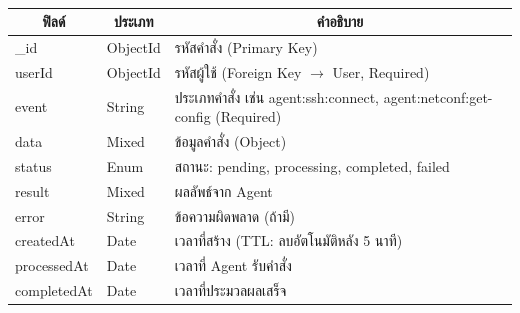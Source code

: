 
\begin{table}[H]
    \caption{}
    \label{tab:agent-command-structure}
    \fontSixTeen 
    \begin{tabularx}{\textwidth}{|l|l|X|} 
        \hline
        \multicolumn{1}{|c|}{\textbf{ฟิลด์}} & \multicolumn{1}{c|}{\textbf{ประเภท}} & \multicolumn{1}{c|}{\textbf{คำอธิบาย}} \\
        \hline
        \_id & ObjectId & รหัสคำสั่ง (Primary Key) \\
        \hline
        userId & ObjectId & รหัสผู้ใช้ (Foreign Key $\rightarrow$ User, Required) \\
        \hline
        event & String & ประเภทคำสั่ง เช่น agent:ssh:connect, agent:netconf:get-config (Required) \\
        \hline
        data & Mixed & ข้อมูลคำสั่ง (Object) \\
        \hline
        status & Enum & สถานะ: pending, processing, completed, failed \\
        \hline
        result & Mixed & ผลลัพธ์จาก Agent \\
        \hline
        error & String & ข้อความผิดพลาด (ถ้ามี) \\
        \hline
        createdAt & Date & เวลาที่สร้าง (TTL: ลบอัตโนมัติหลัง 5 นาที) \\
        \hline
        processedAt & Date & เวลาที่ Agent รับคำสั่ง \\
        \hline
        completedAt & Date & เวลาที่ประมวลผลเสร็จ \\
        \hline
    \end{tabularx}
\end{table}


